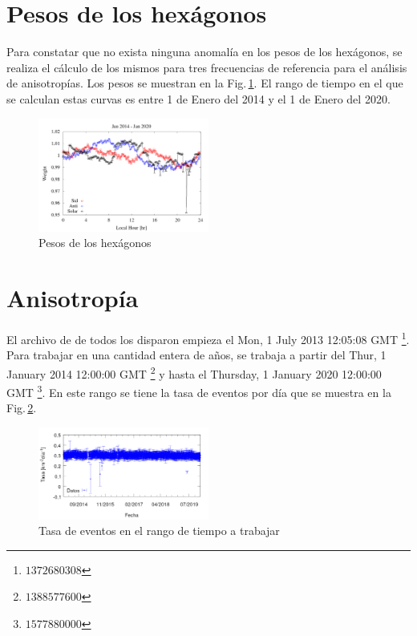 \section{Pesos de los hexágonos}

Para constatar que no exista ninguna anomalía en los pesos de los hexágonos, se realiza el cálculo de los mismos para tres frecuencias de referencia para el análisis de anisotropías.  Los pesos se muestran en la Fig.\,\ref{fig:wei_14_20}. El rango de tiempo en el que se calculan estas curvas es entre 1 de Enero del 2014 y el 1 de Enero del 2020.

\begin{figure}[H]
	\centering
	\includegraphics[width=0.5\textwidth]{weigth2014-2020_jan.png} 	
	\caption{Pesos de los hexágonos}
	\label{fig:wei_14_20}
\end{figure}

\section{Anisotropía}
El archivo de de todos los disparon empieza el Mon, 1 July 2013 12:05:08 GMT \footnote{$1372680308$}. Para trabajar en una cantidad entera de años, se trabaja a partir del  Thur, 1 January 2014 12:00:00 GMT \footnote{$1388577600$} y hasta el Thursday, 1 January 2020 12:00:00 GMT \footnote{$1577880000$}.  En este rango se tiene la tasa de eventos por día que se muestra en la Fig.\,\ref{tasa_total_diaria}.


\begin{figure}[H]
	\centering
	\includegraphics[width=0.5\textwidth]{rate_total.png}
	\caption{Tasa  de eventos en el rango de tiempo a trabajar}
	\label{tasa_total_diaria}
\end{figure}

